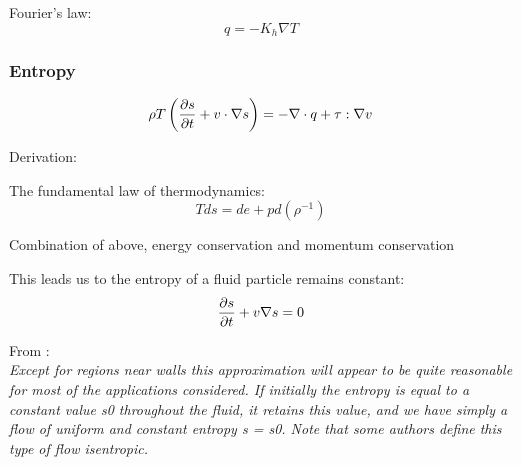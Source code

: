 \documentclass[main.tex]{subfiles}
\begin{document}

Fourier's law:
$$q = -K_h\nabla T$$

\subsubsection{Entropy}
$$\rho T \left(\frac{\partial s}{\partial t} + v\cdot \nabla s\right) = - \nabla\cdot q + \tau : \nabla v$$

Derivation:

The fundamental law of thermodynamics:
$$T ds = de + p d\left(\rho^{-1}\right)$$

Combination of above, energy conservation and momentum conservation

This leads us to the entropy of a fluid particle remains constant:
$$\frac{\partial s}{\partial t} + v\nabla s = 0$$

From \cite{rienstra_introduction_nodate}: \\
\textit{Except for regions near walls this approximation will appear to be quite reasonable for most of the applications considered. If initially the entropy is equal to a constant value s0 throughout the fluid, it
retains this value, and we have simply a flow of uniform and constant entropy s = s0. Note that some
authors define this type of flow isentropic.}

\end{document}
